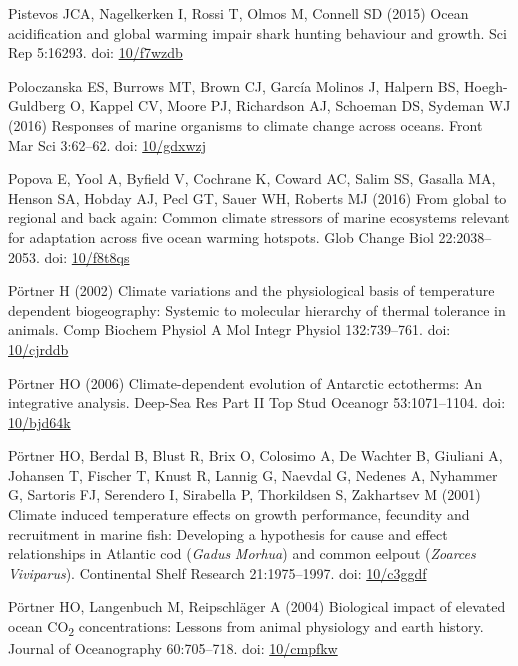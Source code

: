 \documentclass[a4paper,10pt, oneside]{memoir}
\begin{document}
\leavevmode\hypertarget{ref-Pistevos2015}{}%
Pistevos JCA, Nagelkerken I, Rossi T, Olmos M, Connell SD (2015) Ocean acidification and global warming impair shark hunting behaviour and growth. Sci Rep 5:16293. doi: \href{https://doi.org/10/f7wzdb}{10/f7wzdb}

\leavevmode\hypertarget{ref-Poloczanska2016}{}%
Poloczanska ES, Burrows MT, Brown CJ, García Molinos J, Halpern BS, Hoegh-Guldberg O, Kappel CV, Moore PJ, Richardson AJ, Schoeman DS, Sydeman WJ (2016) Responses of marine organisms to climate change across oceans. Front Mar Sci 3:62--62. doi: \href{https://doi.org/10/gdxwzj}{10/gdxwzj}

\leavevmode\hypertarget{ref-Popova2016}{}%
Popova E, Yool A, Byfield V, Cochrane K, Coward AC, Salim SS, Gasalla MA, Henson SA, Hobday AJ, Pecl GT, Sauer WH, Roberts MJ (2016) From global to regional and back again: Common climate stressors of marine ecosystems relevant for adaptation across five ocean warming hotspots. Glob Change Biol 22:2038--2053. doi: \href{https://doi.org/10/f8t8qs}{10/f8t8qs}

\leavevmode\hypertarget{ref-Portner2002}{}%
Pörtner H (2002) Climate variations and the physiological basis of temperature dependent biogeography: Systemic to molecular hierarchy of thermal tolerance in animals. Comp Biochem Physiol A Mol Integr Physiol 132:739--761. doi: \href{https://doi.org/10/cjrddb}{10/cjrddb}

\leavevmode\hypertarget{ref-Portner2006}{}%
Pörtner HO (2006) Climate-dependent evolution of Antarctic ectotherms: An integrative analysis. Deep-Sea Res Part II Top Stud Oceanogr 53:1071--1104. doi: \href{https://doi.org/10/bjd64k}{10/bjd64k}

\leavevmode\hypertarget{ref-Portner2001}{}%
Pörtner HO, Berdal B, Blust R, Brix O, Colosimo A, De Wachter B, Giuliani A, Johansen T, Fischer T, Knust R, Lannig G, Naevdal G, Nedenes A, Nyhammer G, Sartoris FJ, Serendero I, Sirabella P, Thorkildsen S, Zakhartsev M (2001) Climate induced temperature effects on growth performance, fecundity and recruitment in marine fish: Developing a hypothesis for cause and effect relationships in Atlantic cod (\emph{Gadus} \emph{Morhua}) and common eelpout (\emph{Zoarces} \emph{Viviparus}). Continental Shelf Research 21:1975--1997. doi: \href{https://doi.org/10/c3ggdf}{10/c3ggdf}

\leavevmode\hypertarget{ref-Portner2004}{}%
Pörtner HO, Langenbuch M, Reipschläger A (2004) Biological impact of elevated ocean CO\textsubscript{2} concentrations: Lessons from animal physiology and earth history. Journal of Oceanography 60:705--718. doi: \href{https://doi.org/10/cmpfkw}{10/cmpfkw}
\end{document}
